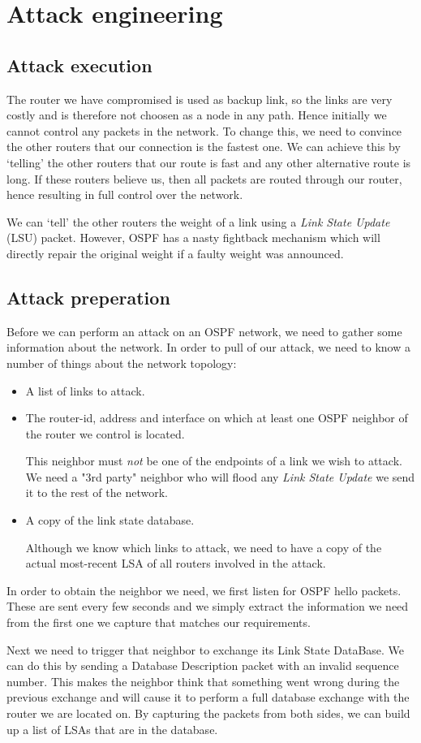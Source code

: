 \documentclass[11pt,a4paper,oneside]{article}
\newcommand{\lsection}[2]{\section{#1}\label{sec:#2}}
\newcommand{\lsubsection}[2]{\subsection{#1}\label{sec:#2}}
\begin{document}
    \lsection{Attack engineering}{attack}


    \lsubsection{Attack execution}{attack_exec}
    The router we have compromised is used as backup link, so the links are very costly and is therefore not choosen as a node in any path. Hence initially we cannot control any packets in the network. To change this, we need to convince the other routers that our connection is the fastest one. We can achieve this by `telling' the other routers that our route is fast and any other alternative route is long. If these routers believe us, then all packets are routed through our router, hence resulting in full control over the network.

    We can `tell' the other routers the weight of a link using a \textit{Link State Update} (LSU) packet. However, OSPF has a nasty fightback mechanism which will directly repair the original weight if a faulty weight was announced.

    \lsubsection{Attack preperation}{attack_prep}
    Before we can perform an attack on an OSPF network, we need to gather some information about the network.
    In order to pull of our attack, we need to know a number of things about the network topology:
    \begin{itemize}
        \item A list of links to attack.
        \item The router-id, address and interface on which at least one OSPF neighbor of the router we control is located.

        This neighbor must \textit{not} be one of the endpoints of a link we wish to attack.
        We need a "3rd party" neighbor who will flood any \textit{Link State Update} we send it to the rest of the network.
        \item A copy of the link state database.

        Although we know which links to attack, we need to have a copy of the actual most-recent LSA of all routers involved in the attack.
    \end{itemize}

    In order to obtain the neighbor we need, we first listen for OSPF hello packets.
    These are sent every few seconds and we simply extract the information we need from the first one we capture that matches our requirements.

    Next we need to trigger that neighbor to exchange its Link State DataBase.
    We can do this by sending a Database Description packet with an invalid sequence number.
    This makes the neighbor think that something went wrong during the previous exchange and will cause it to perform a full database exchange with the router we are located on.
    By capturing the packets from both sides, we can build up a list of LSAs that are in the database.
\end{document}
